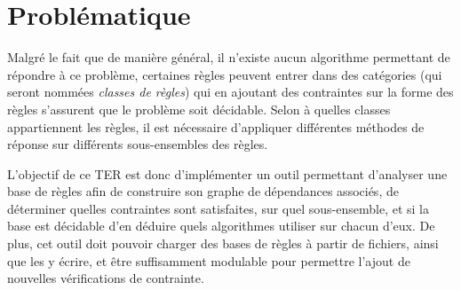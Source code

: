 
\section{Problématique}
Malgré le fait que de manière général, il n'existe aucun algorithme permettant de
répondre à ce problème, certaines règles peuvent entrer dans des catégories (qui seront
nommées {\em classes de règles}) qui en ajoutant des contraintes sur la forme des règles
s'assurent que le problème soit décidable.
Selon à quelles classes appartiennent les règles, il est nécessaire d'appliquer différentes
méthodes de réponse sur différents sous-ensembles des règles.

L'objectif de ce TER est donc d'implémenter un outil permettant d'analyser une base de règles 
afin de construire son graphe
de dépendances associés, de déterminer quelles contraintes sont satisfaites, sur quel
sous-ensemble, et si la base est décidable d'en déduire quels algorithmes utiliser 
sur chacun d'eux. 
De plus, cet outil doit pouvoir charger des bases de règles à partir de fichiers, 
ainsi que les y écrire, 
et être suffisamment modulable pour permettre l'ajout de nouvelles vérifications
de contrainte.

